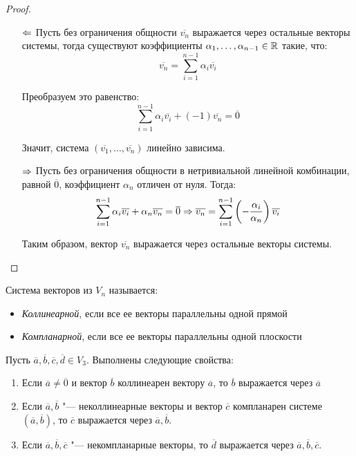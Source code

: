     \begin{proof}~
    	\begin{itemize}
    		\item[$\Leftarrow$] Пусть без ограничения общности $\overline{v_n}$ выражается через остальные векторы системы, тогда существуют коэффициенты $\alpha_1, \dotsc, \alpha_{n-1} \in \mathbb{R}$ такие, что:
    		\[\overline{v_n} = \sum_{i = 1}^{n - 1}\alpha_i\overline{v_i}\]
    		
    		Преобразуем это равенство:
    		\[\sum_{i = 1}^{n - 1}\alpha_i\overline{v_i} + (-1)\overline{v_n} = \overline{0}\]
    		
    		Значит, система $(\overline{v_1}, \dotsc, \overline{v_n})$ линейно зависима.
    		
    		\item[$\Rightarrow$] Пусть без ограничения общности в нетривиальной линейной комбинации, равной $\overline{0}$, коэффициент $\alpha_n$ отличен от нуля. Тогда:
    		\[\sum_{i = 1}^{n - 1}\alpha_i\overline{v_i} + \alpha_n\overline{v_n} = \overline{0} \Rightarrow
    		\overline{v_n} = \sum_{i = 1}^{n - 1}\left(-\frac{\alpha_i}{\alpha_n}\right)\overline{v_i}\]
    			
    		Таким образом, вектор $\overline{v_n}$ выражается через остальные векторы системы. \qedhere
    	\end{itemize}
     
    \end{proof}
    
    \begin{definition}
    	Система векторов из $V_n$ называется:
    	\begin{itemize}
    		\item \textit{Коллинеарной}, если все ее векторы параллельны одной прямой
    		\item \textit{Компланарной}, если все ее векторы параллельны одной плоскости
    	\end{itemize}
        \pagebreak
    \end{definition}

    \begin{proposition}
    	Пусть $\overline{a}, \overline{b}, \overline{c}, \overline{d} \in V_3$. Выполнены следующие свойства:
    	\begin{enumerate}
    		\item Если $\overline{a} \ne \overline{0}$ и вектор $\overline{b}$ коллинеарен вектору $\overline{a}$, то $\overline{b}$ выражается через $\overline{a}$
    		\item Если $\overline{a}, \overline{b}$ "--- неколлинеарные векторы и вектор $\overline{c}$ компланарен системе $(\overline{a}, \overline{b})$, то $\overline{c}$ выражается через $\overline{a}, \overline{b}$.
    		\item Если $\overline{a}, \overline{b}, \overline{c}$ "--- некомпланарные векторы, то $\overline{d}$ выражается через $\overline{a}, \overline{b}, \overline{c}$.
    	\end{enumerate}
    \end{proposition}
    
